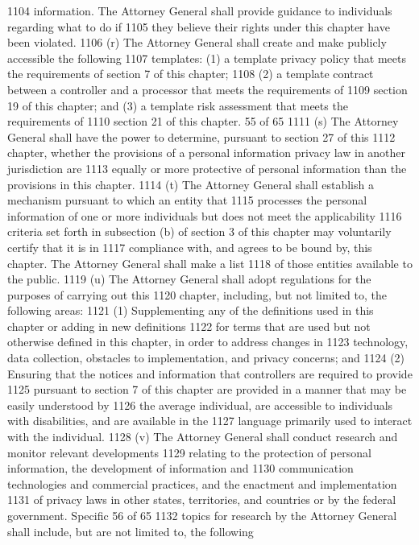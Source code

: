 1104 information. The Attorney General shall provide guidance to individuals regarding what to do if
1105 they believe their rights under this chapter have been violated.
1106 (r) The Attorney General shall create and make publicly accessible the following
1107 templates: (1) a template privacy policy that meets the requirements of section 7 of this chapter;
1108 (2) a template contract between a controller and a processor that meets the requirements of
1109 section 19 of this chapter; and (3) a template risk assessment that meets the requirements of
1110 section 21 of this chapter.
55 of 65
1111 (s) The Attorney General shall have the power to determine, pursuant to section 27 of this
1112 chapter, whether the provisions of a personal information privacy law in another jurisdiction are
1113 equally or more protective of personal information than the provisions in this chapter.
1114 (t) The Attorney General shall establish a mechanism pursuant to which an entity that
1115 processes the personal information of one or more individuals but does not meet the applicability
1116 criteria set forth in subsection (b) of section 3 of this chapter may voluntarily certify that it is in
1117 compliance with, and agrees to be bound by, this chapter. The Attorney General shall make a list
1118 of those entities available to the public.
1119 (u) The Attorney General shall adopt regulations for the purposes of carrying out this
1120 chapter, including, but not limited to, the following areas:
1121 (1) Supplementing any of the definitions used in this chapter or adding in new definitions
1122 for terms that are used but not otherwise defined in this chapter, in order to address changes in
1123 technology, data collection, obstacles to implementation, and privacy concerns; and
1124 (2) Ensuring that the notices and information that controllers are required to provide
1125 pursuant to section 7 of this chapter are provided in a manner that may be easily understood by
1126 the average individual, are accessible to individuals with disabilities, and are available in the
1127 language primarily used to interact with the individual.
1128 (v) The Attorney General shall conduct research and monitor relevant developments
1129 relating to the protection of personal information, the development of information and
1130 communication technologies and commercial practices, and the enactment and implementation
1131 of privacy laws in other states, territories, and countries or by the federal government. Specific
56 of 65
1132 topics for research by the Attorney General shall include, but are not limited to, the following
